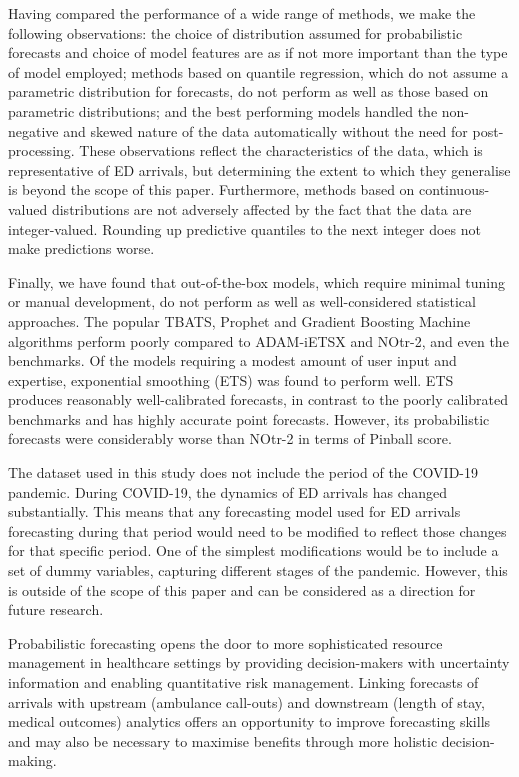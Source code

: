\documentclass[]{elsarticle} %
\begin{document}
Having compared the performance of a wide range of methods, we make the
following observations: the choice of distribution assumed for
probabilistic forecasts and choice of model features are as if not more
important than the type of model employed; methods based on quantile
regression, which do not assume a parametric distribution for forecasts,
do not perform as well as those based on parametric distributions; and
the best performing models handled the non-negative and skewed nature of
the data automatically without the need for post-processing. These
observations reflect the characteristics of the data, which is
representative of ED arrivals, but determining the extent to which they
generalise is beyond the scope of this paper. Furthermore, methods based
on continuous-valued distributions are not adversely affected by the
fact that the data are integer-valued. Rounding up predictive quantiles
to the next integer does not make predictions worse.

Finally, we have found that out-of-the-box models, which require minimal
tuning or manual development, do not perform as well as well-considered
statistical approaches. The popular TBATS, Prophet and Gradient Boosting
Machine algorithms perform poorly compared to ADAM-iETSX and NOtr-2, and
even the benchmarks. Of the models requiring a modest amount of user
input and expertise, exponential smoothing (ETS) was found to perform
well. ETS produces reasonably well-calibrated forecasts, in contrast to
the poorly calibrated benchmarks and has highly accurate point
forecasts. However, its probabilistic forecasts were considerably worse
than NOtr-2 in terms of Pinball score.


The dataset used in this study does not include the period of the COVID-19 pandemic.
During COVID-19, the dynamics of ED arrivals has changed substantially. This means that
any forecasting model used for ED arrivals forecasting during that period would need to be
modified to reflect those changes for that specific period. One of the simplest modifications
would be to include a set of dummy variables, capturing different stages of the pandemic.
However, this is outside of the scope of this paper and can be considered as a direction for
future research.

Probabilistic forecasting opens the door to more sophisticated resource
management in healthcare settings by providing decision-makers with
uncertainty information and enabling quantitative risk management.
Linking forecasts of arrivals with upstream (ambulance call-outs) and
downstream (length of stay, medical outcomes) analytics offers an
opportunity to improve forecasting skills and may also be necessary to
maximise benefits through more holistic decision-making.
\end{document}
